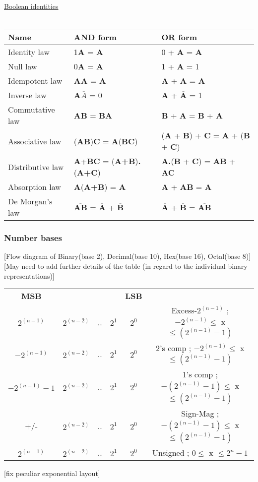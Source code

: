 \documentclass{article}
\begin{document}
\underline{Boolean identities} \\ \\
\begin{tabular}{l|l|l}
Name & \textbf{AND} form & \textbf{OR} form \\
\hline
Identity law & 1\textbf{A} = \textbf{A} & 0 + \textbf{A} = \textbf{A} \\
Null law & 0\textbf{A} = \textbf{A} & 1 + \textbf{A} = 1 \\
Idempotent law & \textbf{AA} = \textbf{A} & \textbf{A} + \textbf{A} = \textbf{A} \\
Inverse law & \textbf{A$\overline{A}$} = 0 & \textbf{A} + $\overline{\textbf{A}}$ = 1 \\
Commutative law & \textbf{AB} = \textbf{BA} & \textbf{B} + \textbf{A} = \textbf{B} + \textbf{A} \\
Associative law &(\textbf{AB})\textbf{C} = \textbf{A}(\textbf{BC}) & (\textbf{A} + \textbf{B}) + \textbf{C} = \textbf{A} + 
(\textbf{B} + \textbf{C}) \\
Distributive law & \textbf{A}+\textbf{BC} = (\textbf{A+B})\textbf{.}(\textbf{A+C}) & \textbf{A.}(\textbf{B} + \textbf{C}) = \textbf{AB} + \textbf{AC} \\
Absorption law & \textbf{A}(\textbf{A+B}) = \textbf{A} & \textbf{A} + \textbf{AB} = \textbf{A}\\
De Morgan's law & $\overline{\textbf{AB}}$ = $\overline{\textbf{A}}$ + $\overline{\textbf{B}}$&
$\overline{\textbf{A}}$ + $\overline{\textbf{B}}$ = $\overline{\textbf{AB}}$ 
\end{tabular}

\subsubsection{Number bases}
[Flow diagram of Binary(base 2), Decimal(base 10), Hex(base 16), Octal(base 8)]
[May need to add further details of the table (in regard to the individual binary representations)]

\begin{tabular}{ c | c | c | c | c | c }
\hline
\textbf{MSB} &  &  &  &  \textbf{LSB} &  \\
$2^(n-1)$ & $2^(n-2)$ & .. & $2^1$ & $2^0$ & Excess-$2^(n-1)$ ; $-2^(n-1) \leq$ x $\leq (2^(n-1)-1)$ \\
$-2^(n-1)$ & $2^(n-2)$ & .. & $2^1$ & $2^0$ & 2's comp ; $-2^(n-1) \leq$ x $\leq (2^(n-1)-1)$ \\
$-2^(n-1)-1$ & $2^(n-2)$ & .. & $2^1$ & $2^0$ & 1's comp ; $-(2^(n-1)-1) \leq$ x $\leq (2^(n-1)-1)$ \\
+/- & $2^(n-2)$ & .. & $2^1$ & $2^0$ & Sign-Mag ; $-(2^(n-1)-1) \leq$ x $\leq (2^(n-1)-1)$ \\
$2^(n-1)$ & $2^(n-2)$ & .. & $2^1$ & $2^0$ & Unsigned ; $0 \leq$ x $\leq 2^n-1$ \\
\end{tabular}
[fix peculiar exponential  layout]
\end{document}
